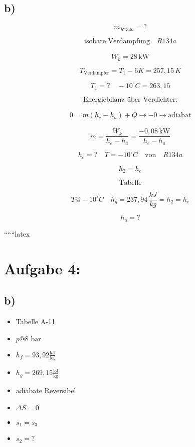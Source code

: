 

\subsection*{b)}

\[
\dot{m}_{R134a} = ?
\]

\[
\text{isobare Verdampfung} \quad R134a
\]

\[
\dot{W}_k = 28 \, \text{kW}
\]

\[
T_{\text{Verdampfer}} = T_1 - 6K = 257,15 \, K
\]

\[
T_1 = ? \quad -10^\circ C = 263,15
\]

\[
\text{Energiebilanz über Verdichter:}
\]

\[
0 = \dot{m} (h_e - h_a) + \dot{Q} \rightarrow -0 \rightarrow \text{adiabat}
\]

\[
\dot{m} = \frac{\dot{W}_k}{h_e - h_a} = \frac{-0,08 \, \text{kW}}{h_e - h_a}
\]

\[
h_e = ? \quad T = -10^\circ C \quad \text{von} \quad R134a
\]

\[
h_2 = h_e
\]

\[
\text{Tabelle}
\]

\[
T@ -10^\circ C \quad h_g = 237,94 \, \frac{kJ}{kg} = h_2 = h_e
\]

\[
h_a = ?
\]

``````latex


\section*{Aufgabe 4:}



\subsection*{b)}

\begin{itemize}
    \item Tabelle A-11
    \item $p@8 \text{ bar}$
    \item $h_f = 93,92 \frac{\text{kJ}}{\text{kg}}$
    \item $h_g = 269,15 \frac{\text{kJ}}{\text{kg}}$
    \item adiabate Reversibel
    \item $\Delta S = 0$
    \item $s_1 = s_3$
    \item $s_2 = ?$
\end{itemize}


